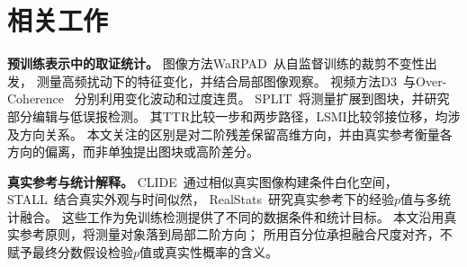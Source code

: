 \section{相关工作}
\label{sec:related_work}

\textbf{预训练表示中的取证统计。}
图像方法WaRPAD~\cite{choi2025warpad}从自监督训练的裁剪不变性出发，
测量高频扰动下的特征变化，并结合局部图像观察。
视频方法D3~\cite{zheng2025d3}与Over-Coherence~\cite{brokman2026overcoherence}
分别利用变化波动和过度连贯。
SPLIT~\cite{hyun2026split}将测量扩展到图块，并研究部分编辑与低误报检测。
其TTR比较一步和两步路径，LSMI比较邻接位移，均涉及方向关系。
本文关注的区别是对二阶残差保留高维方向，并由真实参考衡量各方向的偏离，而非单独提出图块或高阶差分。

\textbf{真实参考与统计解释。}
CLIDE~\cite{betser2026conditional}通过相似真实图像构建条件白化空间，
STALL~\cite{benhayun2026stall}结合真实外观与时间似然，
RealStats~\cite{zisman2026realstats}研究真实参考下的经验$p$值与多统计融合。
这些工作为免训练检测提供了不同的数据条件和统计目标。
本文沿用真实参考原则，将测量对象落到局部二阶方向；
所用百分位承担融合尺度对齐，不赋予最终分数假设检验$p$值或真实性概率的含义。
